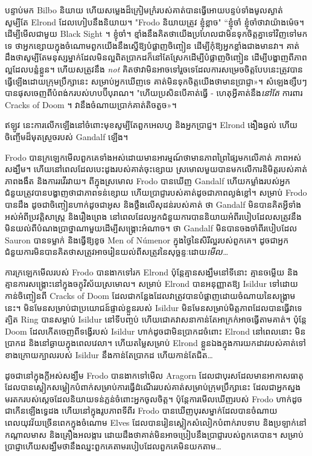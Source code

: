 បន្ទាប់មក Bilbo និយាយ ហើយសម្លេងដ៏ក្រៀមក្រំរបស់គាត់បានធ្វើអោយបន្ទប់ទាំងមូលស្ងាត់ សូម្បីតែ Elrond ដែលហៀបនឹងនិយាយ។ "Frodo និយាយត្រូវ ខ្ញុំខ្លាច" “ខ្ញុំចាំ ខ្ញុំចាំថាវាយ៉ាងម៉េច។ ដើម្បីមើលជាមួយ Black Sight ។ ខ្ញុំចាំ។ ខ្មាំងនឹងគិតថាយើងប្រហែលជាមិនទុកចិត្តគ្នាទៅវិញទៅមកទេ ថាអ្នកខ្សោយក្នុងចំណោមពួកយើងនឹងស្នើឱ្យបំផ្លាញចិញ្ចៀន ដើម្បីកុំឱ្យអ្នកខ្លាំងជាងមានវា។ គាត់ដឹងថាសូម្បីតែមនុស្សម្នាក់ដែលមិនល្អពិតប្រាកដក៏នៅតែស្រែកដើម្បីបំផ្លាញចិញ្ចៀន ដើម្បីបង្ហាញពីភាពល្អដែលបន្លំខ្លួន។ ហើយសត្រូវនឹង \emph{not} គិតថាវាមិនអាចទៅរួចទេដែលការសម្រេចចិត្តបែបនេះត្រូវបានធ្វើឡើងដោយក្រុមប្រឹក្សានេះ សម្រាប់អ្នកឃើញទេ គាត់មិនទុកចិត្តយើងថាមានប្រាជ្ញា»។ សំឡេង​ខ្សឹប​ៗ​បាន​ផុស​ចេញ​ពី​បំពង់ក​របស់​ហបប៊ី​បុរាណ។ "ហើយប្រសិនបើគាត់ធ្វើ - ហេតុអ្វីគាត់នឹង\emph{នៅតែ} ការពារ Cracks of Doom ។ វា​នឹង​ចំណាយ​ប្រាក់​គាត់​តិច​តួច»។

ឥឡូវ នេះ​ការ​លើក​ឡើង​នៅ​ចំពោះ​មុខ​សូម្បី​តែ​ពួក​អេលហ្វ និង​អ្នក​ប្រាជ្ញ។ Elrond ងឿងឆ្ងល់ ហើយចិញ្ចើមដ៏មុតស្រួចរបស់ Gandalf ឡើង។

Frodo បានក្រឡេកមើលពួកគេទាំងអស់ដោយមានអារម្មណ៍ថាមានភាពព្រៃផ្សៃមកលើគាត់ ភាពអស់សង្ឃឹម។ ហើយនៅពេលដែលបេះដូងរបស់គាត់ចុះខ្សោយ ស្រមោលមួយបានមកលើការនិមិត្តរបស់គាត់ ភាពងងឹត និងការរវើរវាយ។ ពីក្នុងស្រមោល Frodo បានឃើញ Gandalf ហើយកម្លាំងរបស់អ្នកជំនួយត្រូវបានបង្ហាញថាជាភាពទន់ខ្សោយ ហើយប្រាជ្ញារបស់គាត់ដូចជាភាពល្ងង់ខ្លៅ។ សម្រាប់ Frodo បានដឹង ដូចជាចិញ្ចៀនហាក់ដូចជាអូស និងថ្លឹងលើសុដន់របស់គាត់ ថា Gandalf មិនបានគិតអ្វីទាំងអស់អំពីប្រវត្តិសាស្រ្ត និងរឿងព្រេង នៅពេលដែលអ្នកជំនួយការបាននិយាយអំពីរបៀបដែលសត្រូវនឹងមិនយល់ពីបំណងប្រាថ្នាណាមួយដើម្បីសង្គ្រោះអំណាច។ ថា Gandalf មិនបានចងចាំពីរបៀបដែល Sauron បានទម្លាក់ និងធ្វើឱ្យខូច Men of Númenor ក្នុងថ្ងៃនៃសិរីល្អរបស់ពួកគេ។ ដូចជាអ្នកជំនួយការមិនបានគិតថាសត្រូវអាចរៀនយល់ពីសត្រូវនៃសុច្ឆន្ទៈដោយ\emph{មើល…}

ការក្រឡេកមើលរបស់ Frodo បានងាកទៅរក Elrond ប៉ុន្តែគ្មានសង្ឃឹមនៅទីនោះ គ្មានចម្លើយ និងគ្មានការសង្គ្រោះនៅក្នុងចក្ខុវិស័យស្រមោល។ សម្រាប់ Elrond បានអនុញ្ញាតឱ្យ Isildur ទៅដោយកាន់ចិញ្ចៀនពី Cracks of Doom ដែលជាកន្លែងដែលវាត្រូវបានបំផ្លាញដោយចំណាយនៃសង្រ្គាមនេះ។ មិនមែនសម្រាប់ជាប្រយោជន៍ផ្ទាល់ខ្លួនរបស់ Isildur មិនមែនសម្រាប់មិត្តភាពដែលបានធ្វើវាទេ ត្បិត Ring បានសម្លាប់ Isildur នៅទីបញ្ចប់ ហើយជោគវាសនាកាន់តែអាក្រក់អាចធ្វើតាមគាត់។ ប៉ុន្តែ Doom ដែលកើតចេញពីទង្វើរបស់ Isildur ហាក់ដូចជាមិនប្រាកដចំពោះ Elrond នៅពេលនោះ មិនប្រាកដ និងនៅឆ្ងាយក្នុងពេលវេលា។ ហើយតម្លៃសម្រាប់ Elrond ខ្លួនឯងក្នុងការយកដាវរបស់គាត់ទៅខាងក្រោយក្បាលរបស់ Isildur នឹងកាន់តែប្រាកដ ហើយកាន់តែជិត…

ដូចជានៅក្នុងក្តីអស់សង្ឃឹម Frodo បានងាកទៅមើល Aragorn ដែលជាបុរសដែលមានអាកាសធាតុដែលបានស្លៀកសម្លៀកបំពាក់សម្រាប់ការធ្វើដំណើររបស់គាត់សម្រាប់ក្រុមប្រឹក្សានេះ ដែលជាអ្នកស្នងមរតករបស់ស្តេចដែលនិយាយទន់ភ្លន់ចំពោះអ្នកចូលចិត្ត។ ប៉ុន្តែការមើលឃើញរបស់ Frodo ហាក់ដូចជាកើនឡើងទ្វេដង ហើយនៅក្នុងរូបភាពទីពីរ Frodo បានឃើញបុរសម្នាក់ដែលបានចំណាយពេលយុវវ័យច្រើនពេកក្នុងចំណោម Elves ដែលបានរៀនស្លៀកសំលៀកបំពាក់រាបទាប និងប្រឡាក់នៅកណ្តាលមាស និងគ្រឿងអលង្ការ ដោយដឹងថាគាត់មិនអាចប្រៀបនឹងប្រាជ្ញារបស់ពួកគេបាន។ សម្រាប់​ប្រាជ្ញា​ ហើយ​សង្ឃឹម​ថា​នឹង​ឈ្នះ​ពួកគេ​តាម​របៀប​ដែល​ពួកគេ​មិន​យក​តាម​…

